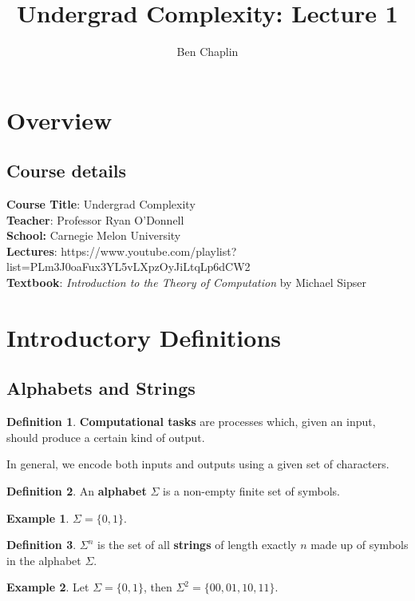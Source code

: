 \documentclass[11pt]{article}
\title{Undergrad Complexity: Lecture 1}
\author{Ben Chaplin}
\date{}
\theoremstyle{plain}
\theoremstyle{definition}
\newtheorem*{defn}{Definition}
\newtheorem*{ex}{Example}
\begin{document}
\maketitle
\tableofcontents

\section{Overview}
\subsection{Course details}

{\bf Course Title}: Undergrad Complexity\\
{\bf Teacher}: Professor Ryan O'Donnell\\
{\bf School:} Carnegie Melon University\\
{\bf Lectures}: https://www.youtube.com/playlist?list=PLm3J0oaFux3YL5vLXpzOyJiLtqLp6dCW2\\
{\bf Textbook}: {\it Introduction to the Theory of Computation} by Michael Sipser

\section{Introductory Definitions}
\subsection{Alphabets and Strings}

\begin{defn}
    {\bf Computational tasks} are processes which, given an input, should produce a certain kind of 
    output.
\end{defn}

In general, we encode both inputs and outputs using a given set of characters.

\begin{defn}
    An {\bf alphabet} $\Sigma$ is a non-empty finite set of symbols.
\end{defn}

\begin{ex}
    $\Sigma = \{0, 1\}$.
\end{ex}

\begin{defn}
    $\Sigma^n$ is the set of all {\bf strings} of length exactly $n$ made up of symbols in the
    alphabet $\Sigma$.
\end{defn}

\begin{ex}
    Let $\Sigma = \{0, 1\}$, then $\Sigma^2 = \{00, 01, 10, 11\}$.
\end{ex}
\end{document}
